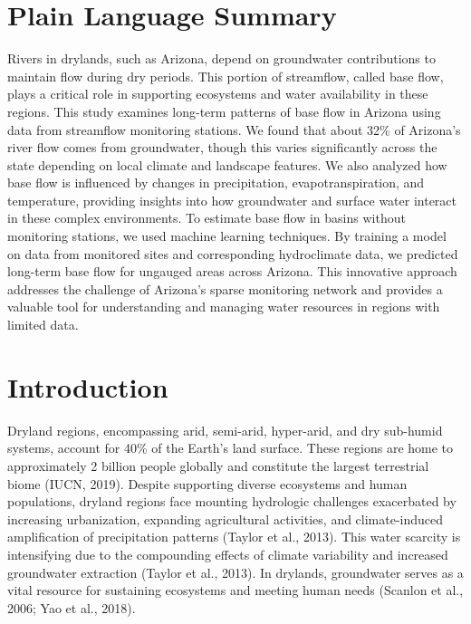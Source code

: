 \documentclass[
]{agujournal2019}
\begin{document}
\section*{Plain Language Summary}
Rivers in drylands, such as Arizona, depend on groundwater contributions
to maintain flow during dry periods. This portion of streamflow, called
base flow, plays a critical role in supporting ecosystems and water
availability in these regions. This study examines long-term patterns of
base flow in Arizona using data from streamflow monitoring stations. We
found that about 32\% of Arizona's river flow comes from groundwater,
though this varies significantly across the state depending on local
climate and landscape features. We also analyzed how base flow is
influenced by changes in precipitation, evapotranspiration, and
temperature, providing insights into how groundwater and surface water
interact in these complex environments. To estimate base flow in basins
without monitoring stations, we used machine learning techniques. By
training a model on data from monitored sites and corresponding
hydroclimate data, we predicted long-term base flow for ungauged areas
across Arizona. This innovative approach addresses the challenge of
Arizona's sparse monitoring network and provides a valuable tool for
understanding and managing water resources in regions with limited data.




\section{Introduction}\label{sec-intro}

Dryland regions, encompassing arid, semi-arid, hyper-arid, and dry
sub-humid systems, account for 40\% of the Earth's land surface. These
regions are home to approximately 2 billion people globally and
constitute the largest terrestrial biome (IUCN, 2019). Despite
supporting diverse ecosystems and human populations, dryland regions
face mounting hydrologic challenges exacerbated by increasing
urbanization, expanding agricultural activities, and climate-induced
amplification of precipitation patterns (Taylor et al., 2013). This
water scarcity is intensifying due to the compounding effects of climate
variability and increased groundwater extraction (Taylor et al., 2013).
In drylands, groundwater serves as a vital resource for sustaining
ecosystems and meeting human needs (Scanlon et al., 2006; Yao et al.,
2018).
\end{document}
